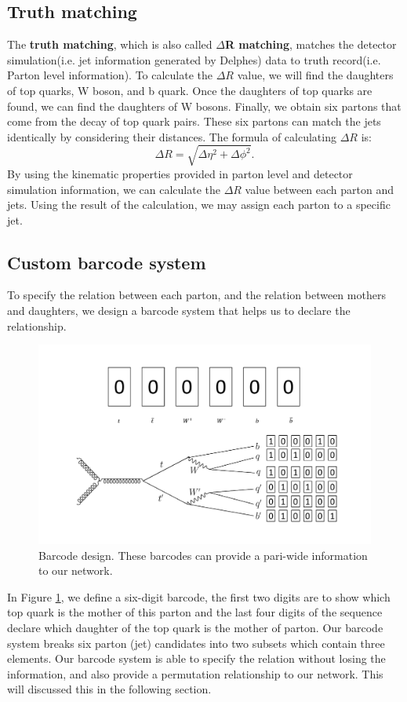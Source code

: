 \subsection{Truth matching}\label{subsec:Truth matching}
The \textbf{truth matching}, which is also called \textbf{$\Delta$R matching},  matches the detector simulation(i.e. jet information generated by Delphes) data to truth record(i.e. Parton level information).  To calculate the $\Delta R$ value, we will find the daughters of top quarks, W boson, and b quark. Once the daughters of top quarks are found, we can find the daughters of W bosons. Finally, we obtain six partons that come from the decay of top quark pairs. These six partons can match the jets identically by considering their distances. The formula of calculating $\Delta R$ is:
\\
\begin{equation}
	\Delta R = \sqrt{\Delta\eta^{2} + \Delta\phi^{2}}.
\end{equation}
By using the kinematic properties provided in parton level and detector simulation information, we can calculate the $\Delta R$ value between each parton and jets. Using the result of the calculation, we may assign each parton to a specific jet. 
\\
\newpage
\subsection{Custom barcode system}\label{subsec:barcode}
To specify the relation between each parton, and the relation between mothers and daughters, we design a barcode system that helps us to declare the relationship.
\begin{figure}[H]
	\centering
	\includegraphics[width=1.1\linewidth]{Figures/barcode.pdf}
	\caption{Barcode design. These barcodes can provide a pari-wide information to our network.}
	\label{fig:barcode}
\end{figure}
In Figure \ref{fig:barcode}, we define a six-digit barcode, the first two digits are to show which top quark is the mother of this parton and the last four digits of the sequence declare which daughter of the top quark is the mother of parton. Our barcode system breaks six parton (jet) candidates into two subsets which contain three elements. Our barcode system is able to specify the relation without losing the information, and also provide a permutation relationship to our network. This will discussed this in the following section.
\\
\newpage
